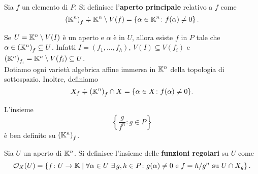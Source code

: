 \begin{definition}
    Sia $f$ un elemento di $P$. Si definisce l'\textbf{aperto principale} relativo a $f$ come
	\[\left(\mathbb{K}^n\right)_f\doteqdot \mathbb{K}^n\setminus V(f)=\left\{\alpha\in \mathbb{K}^n \colon f(\alpha)\ne 0\right\}.\] 
\end{definition}
Se $U=\mathbb{K}^n\setminus V(I)$ è un aperto e $\alpha$ è in $U$, allora esiste $f$ in $P$ tale che $\alpha\in\left(\mathbb{K}^n\right)_f\subseteq U$. Infatti $I=(f_1,\dots,f_h)$, $V(I)\subseteq V(f_i)$ e $\left(\mathbb{K}^n\right)_{f_i}=\mathbb{K}^n\setminus V(f_i) \subseteq U$. \\

\noindent Dotiamo ogni varietà algebrica affine immersa in $\mathbb{K}^n$ della topologia di sottospazio. Inoltre, definiamo \[X_f\doteqdot\left(\mathbb{K}^n\right)_f\cap X=\{\alpha\in X \colon f(\alpha)\ne 0\}.\]

\begin{remark}
    L'insieme \[\left\{\frac{g}{f^n} \colon g\in P\right\}\] è ben definito su $\left(\mathbb{K}^n\right)_f$.
\end{remark}

\begin{definition}
    Sia $U$ un aperto di $\mathbb{K}^n$. Si definisce l'insieme delle \textbf{funzioni regolari} su $U$ come \[\mathcal{O}_X(U)=\left\{f\colon U \to \mathbb{K} \mid \forall \alpha \in U \ \exists\,g,h\in P\colon g(\alpha)\ne0 \text{ e } f=h/g^n \text{ su } U\cap X_g\right\}.\]
\end{definition}


